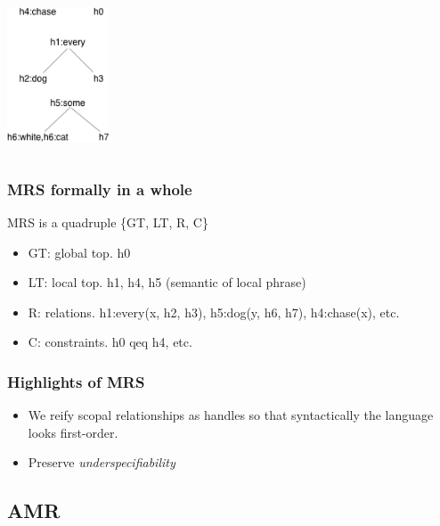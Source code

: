 \documentclass{beamer}
\begin{document}
\begin{frame}
{\begin{columns}

            \includegraphics[height=4cm]{img/unresolved-parse.png}

        \end{columns}
    }

\end{frame}

\begin{frame}
    \frametitle{MRS formally in a whole}

    MRS is a quadruple \{GT, LT, R, C\}

    \begin{itemize}
        \item GT: global top. h0
        \item LT: local top. h1, h4, h5 (semantic of local phrase)
        \item R: relations. h1:every(x, h2, h3), h5:dog(y, h6, h7), h4:chase(x), etc.
        \item C: constraints. h0 qeq h4, etc.
    \end{itemize}
\end{frame}

\begin{frame}
    \frametitle{Highlights of MRS}

    \begin{itemize}
        \item We reify scopal relationships as handles
            so that syntactically the language looks first-order.
        \item Preserve \emph{underspecifiability}
    \end{itemize}
\end{frame}

\subsection{AMR}
\end{document}
